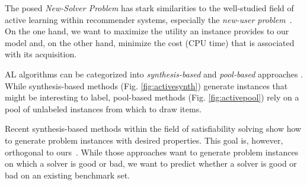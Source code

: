 \documentclass[runningheads]{llncs}
\begin{document}
The posed \emph{New-Solver Problem} has stark similarities to the well-studied field of active learning within recommender systems, especially the \emph{new-user problem}~\cite{RubensESK15}.
On the one hand, we want to maximize the utility an instance provides to our model and, on the other hand, minimize the cost (CPU time) that is associated with its acquisition.


AL algorithms can be categorized into \emph{synthesis-bas\-ed} \cite{0001AEMN22,GarzonMG22,2019gaal} and \emph{pool-bas\-ed} approaches \cite{GolbandiKL11,HarpaleY08,KorenBV09}.%
While synthesis-based methods (Fig. \ref{fig:activesynth}) generate instances that might be interesting to label, pool-based methods (Fig. \ref{fig:activepool}) rely on a pool of unlabeled instances from which to draw items.

Recent synthesis-based methods within the field of satisfiability solving show how to generate problem instances with desired properties.
This goal is, however, orthogonal to ours~\cite{0001AEMN22,GarzonMG22}.
While those approaches want to generate problem instances on which a solver is good or bad, we want to predict whether a solver is good or bad on an existing benchmark set.
\end{document}
